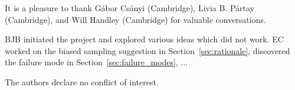 \documentclass[journal,article,accept,moreauthors,pdftex,12pt,a4paper]{mdpi}
\begin{document}

It is a pleasure to thank Gábor Csányi (Cambridge), Livia B. Pártay (Cambridge),
and Will Handley (Cambridge)
for valuable conversations.



BJB initiated the project and explored various ideas which did not work.
EC worked on the biased sampling suggestion in Section~\ref{sec:rationale},
discovered the failure mode in Section~\ref{sec:failure_modes}, ...

The authors declare no conflict of interest.


\makeatletter
\renewcommand\@biblabel[1]{#1. }
\makeatother
\end{document}
